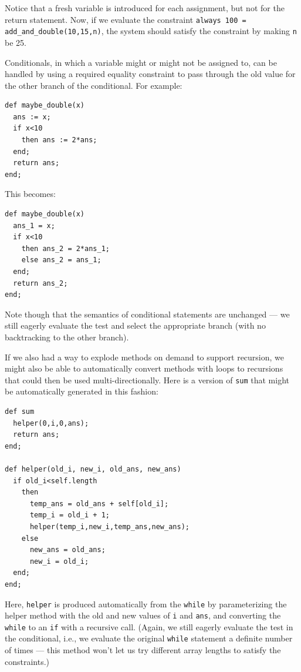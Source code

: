 \documentclass{article}
\begin{document}
Notice that a fresh variable is introduced for each assignment, but
not for the return statement.  Now, if we evaluate the constraint 
\verb|always 100 = add_and_double(10,15,n)|, the system should satisfy
the constraint by making \verb|n| be 25.

Conditionals, in which a variable might or might not be assigned to,
can be handled by using a required equality constraint to pass
through the old value for the other branch of the conditional.  For
example:

\newpage

\begin{verbatim}
def maybe_double(x)
  ans := x;
  if x<10
    then ans := 2*ans;
  end;
  return ans;
end;
\end{verbatim}

This becomes:

\begin{verbatim}
def maybe_double(x)
  ans_1 = x;
  if x<10
    then ans_2 = 2*ans_1;
    else ans_2 = ans_1;
  end;
  return ans_2;
end;
\end{verbatim}

Note though that the semantics of conditional statements are unchanged
--- we still eagerly evaluate the test and select the appropriate
branch (with no backtracking to the other branch).

If we also had a way to explode methods on demand to support
recursion, we might also be able to automatically convert methods with
loops to recursions that could then be used multi-directionally.  Here
is a version of \verb|sum| that might be automatically generated in
this fashion:

\begin{verbatim}
def sum
  helper(0,i,0,ans);
  return ans;
end;

def helper(old_i, new_i, old_ans, new_ans)
  if old_i<self.length
    then 
      temp_ans = old_ans + self[old_i];
      temp_i = old_i + 1;
      helper(temp_i,new_i,temp_ans,new_ans);
    else 
      new_ans = old_ans;
      new_i = old_i;
  end;
end;
\end{verbatim}

Here, \verb|helper| is produced automatically from the \verb|while| by
parameterizing the helper method with the old and new values of
\verb|i| and \verb|ans|, and converting the \verb|while| to an
\verb|if| with a recursive call.  (Again, we still eagerly evaluate
the test in the conditional, i.e., we evaluate the original
\verb|while| statement a definite number of times --- this method
won't let us try different array lengths to satisfy the constraints.)
\end{document}
